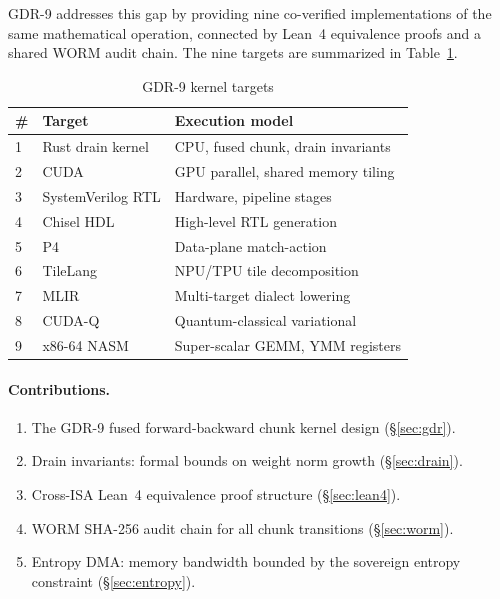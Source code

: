 \documentclass[10pt,conference]{IEEEtran}
\begin{document}
GDR-9 addresses this gap by providing nine co-verified implementations of the
same mathematical operation, connected by Lean~4 equivalence proofs and a
shared WORM audit chain. The nine targets are summarized in Table~\ref{tab:targets}.

\begin{table}[h]
\caption{GDR-9 kernel targets}
\label{tab:targets}
\centering
\begin{tabular}{lll}
\toprule
\# & Target & Execution model \\
\midrule
1 & Rust drain kernel  & CPU, fused chunk, drain invariants \\
2 & CUDA               & GPU parallel, shared memory tiling \\
3 & SystemVerilog RTL  & Hardware, pipeline stages \\
4 & Chisel HDL         & High-level RTL generation \\
5 & P4                 & Data-plane match-action \\
6 & TileLang           & NPU/TPU tile decomposition \\
7 & MLIR               & Multi-target dialect lowering \\
8 & CUDA-Q             & Quantum-classical variational \\
9 & x86-64 NASM        & Super-scalar GEMM, YMM registers \\
\bottomrule
\end{tabular}
\end{table}

\paragraph{Contributions.}
\begin{enumerate}
  \item The GDR-9 fused forward-backward chunk kernel design (\S\ref{sec:gdr}).
  \item Drain invariants: formal bounds on weight norm growth (\S\ref{sec:drain}).
  \item Cross-ISA Lean~4 equivalence proof structure (\S\ref{sec:lean4}).
  \item WORM SHA-256 audit chain for all chunk transitions (\S\ref{sec:worm}).
  \item Entropy DMA: memory bandwidth bounded by the sovereign entropy
    constraint (\S\ref{sec:entropy}).
\end{enumerate}

\end{document}
